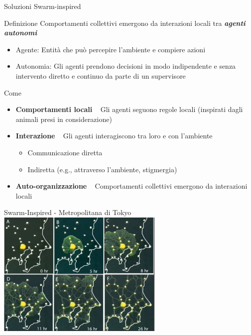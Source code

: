 \documentclass[presentation, 10pt,aspectratio=169]{beamer}\mode<presentation>{\usetheme{AMSBolognaFC}}
\begin{document}
\begin{frame}{Soluzioni Swarm-inspired}
	\begin{exampleblock}{Definizione}
		Comportamenti collettivi \alert{emergono} da interazioni locali tra \emph{\textbf{agenti autonomi}}
		\begin{itemize}
			\item Agente: Entità che può percepire l'ambiente e compiere azioni
			\item Autonomia: Gli agenti prendono decisioni in modo indipendente e senza intervento diretto e continuo da parte di un supervisore
		\end{itemize}
	\end{exampleblock}
	\begin{block}{Come}
		\begin{itemize}
			\item \textbf{Comportamenti locali} \faArrowRight ~ Gli agenti seguono regole locali (inspirati dagli animali presi in considerazione)
			\item \textbf{Interazione} \faArrowRight ~ Gli agenti interagiscono tra loro e con l'ambiente
			\begin{itemize}
				\item Communicazione diretta 
				\item Indiretta (e.g., attraverso l'ambiente, stigmergia)
			\end{itemize}
			\item \textbf{Auto-organizzazione} \faArrowRight ~ Comportamenti collettivi emergono da interazioni locali
		\end{itemize}
	\end{block}
\end{frame}
\begin{frame}{Swarm-Inspired - Metropolitana di Tokyo}
	\centering
	\href{https://www.youtube.com/shorts/GwKuFREOgmo}{\includegraphics[width=0.6\textwidth]{img/metro-tokyo.png}}
\end{frame}
\end{document}
